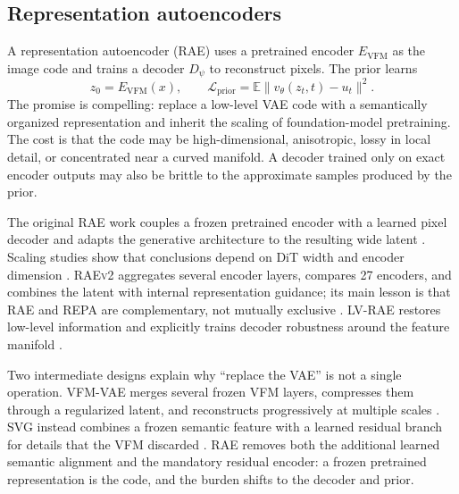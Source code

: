 \documentclass{article}
\newcommand{\E}{\mathbb{E}}
\newcommand{\method}[1]{\textsc{#1}}
\begin{document}
\subsection{Representation autoencoders}

A representation autoencoder (RAE) uses a pretrained encoder \(E_{\mathrm{VFM}}\) as the image code and trains a decoder \(D_\psi\) to reconstruct pixels. The prior learns
\[
z_0=E_{\mathrm{VFM}}(x),\qquad
\mathcal{L}_{\mathrm{prior}}=\E\|v_\theta(z_t,t)-u_t\|^2.
\]
The promise is compelling: replace a low-level VAE code with a semantically organized representation and inherit the scaling of foundation-model pretraining. The cost is that the code may be high-dimensional, anisotropic, lossy in local detail, or concentrated near a curved manifold. A decoder trained only on exact encoder outputs may also be brittle to the approximate samples produced by the prior.

The original RAE work couples a frozen pretrained encoder with a learned pixel decoder and adapts the generative architecture to the resulting wide latent \citep{zheng2025rae}. Scaling studies show that conclusions depend on DiT width and encoder dimension \citep{tong2026scalerae}. \method{RAEv2} aggregates several encoder layers, compares 27 encoders, and combines the latent with internal representation guidance; its main lesson is that RAE and REPA are complementary, not mutually exclusive \citep{singh2026raev2}. \method{LV-RAE} restores low-level information and explicitly trains decoder robustness around the feature manifold \citep{liu2026lvrae}.

Two intermediate designs explain why ``replace the VAE'' is not a single operation. \method{VFM-VAE} merges several frozen VFM layers, compresses them through a regularized latent, and reconstructs progressively at multiple scales \citep{bi2025vfmvae}. \method{SVG} instead combines a frozen semantic feature with a learned residual branch for details that the VFM discarded \citep{shi2025svg}. RAE removes both the additional learned semantic alignment and the mandatory residual encoder: a frozen pretrained representation is the code, and the burden shifts to the decoder and prior.
\end{document}
